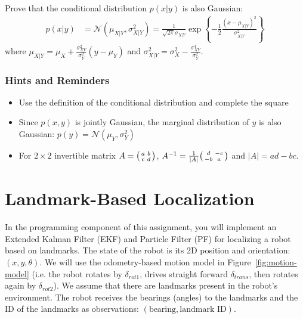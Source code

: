 \documentclass{article}
\newcommand{\?}{\stackrel{?}{=}}
\begin{document}
\bigskip
Prove that the conditional distribution $p(x|y)$ is also Gaussian:
\begin{align*}
  p(x|y)
  &= \mathcal{N}(\mu_{X|Y}, \sigma_{X|Y}^2)
    = \frac{1}{\sqrt{2\pi}\sigma_{X|Y}} \exp \left\{ -\frac{1}{2} \frac{(x - \mu_{X|Y})^2}{\sigma_{X|Y}^2} \right\}
\end{align*}
where $\mu_{X|Y} = \mu_{X} + \frac{\sigma_{XY}^2}{\sigma_{Y}^2} (y - \mu_{Y})$ and
$\sigma_{X|Y}^2 = \sigma_X^2 - \frac{\sigma_{XY}^4}{\sigma_Y^2}$.

\subsubsection*{Hints and Reminders}
\begin{itemize}
\item Use the definition of the conditional distribution and complete the square
\item Since $p(x, y)$ is jointly Gaussian, the marginal distribution of $y$ is
  also Gaussian: $p(y) = \mathcal{N}(\mu_{Y}, \sigma_{Y}^2)$
\item For $2 \times 2$ invertible matrix
  $A = \begin{psmallmatrix} a & b \\ c & d \end{psmallmatrix}$,
  $A^{-1} = \frac{1}{|A|} \begin{psmallmatrix} d & -c \\ -b &
    a \end{psmallmatrix}$ and $|A| = ad - bc$.
\end{itemize}


\section*{Landmark-Based Localization}

%

In the programming component of this assignment, you will implement an Extended Kalman Filter (EKF) and Particle Filter (PF) for localizing a robot based on landmarks.
The state of the robot is its 2D position and orientation: $(x, y, \theta)$.
We will use the odometry-based motion model in Figure~\ref{fig:motion-model}
(i.e. the robot rotates by $\delta_{rot1}$, drives straight forward $\delta_{trans}$, then rotates again by $\delta_{rot2}$).
We assume that there are landmarks present in the robot's environment.
The robot receives the bearings (angles) to the landmarks and the ID of the landmarks as observations: $(\text{bearing}, \text{landmark ID})$.
\end{document}
